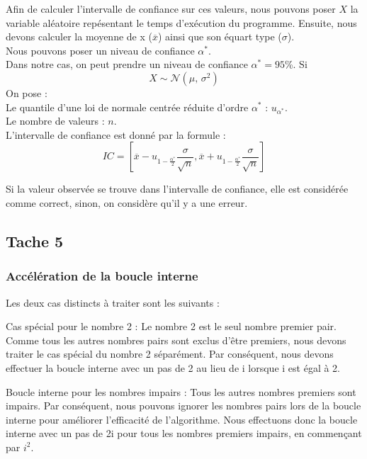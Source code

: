 \documentclass[
    ]{article}
\begin{document}
Afin de calculer l'intervalle de confiance sur ces valeurs, nous pouvons
poser \(X\) la variable aléatoire repésentant le temps d'exécution du
programme. Ensuite, nous devons calculer la moyenne de x
(\(\overline{x}\)) ainsi que son équart type (\(\sigma\)).\\
Nous pouvons poser un niveau de confiance \(\alpha^{*}\).\\
Dans notre cas, on peut prendre un niveau de confiance
\(\alpha^{*} = 95\)\%. Si \[X \sim \mathcal{N}(\mu,\,\sigma^{2})\] On
pose :\\
Le quantile d'une loi de normale centrée réduite d'ordre \(\alpha^{*}\)
: \(u_{\alpha^{*}}\).\\
Le nombre de valeurs : \(n\).\\
L'intervalle de confiance est donné par la formule :\\
\begin{equation}
IC = [\overline{x} - u_{1- \frac{\alpha^{*}}{2}} \frac{\sigma}{\sqrt{n}} , \overline{x} + u_{1- \frac{\alpha^{*}}{2}} \frac{\sigma}{\sqrt{n}} ]
\end{equation}

Si la valeur observée se trouve dans l'intervalle de confiance, elle est
considérée comme correct, sinon, on considère qu'il y a une erreur.

\pagebreak

\hypertarget{tache-5}{%
\subsection{Tache 5}\label{tache-5}}

\hypertarget{accuxe9luxe9ration-de-la-boucle-interne}{%
\subsubsection{Accélération de la boucle
interne}\label{accuxe9luxe9ration-de-la-boucle-interne}}

Les deux cas distincts à traiter sont les suivants :

Cas spécial pour le nombre 2 : Le nombre 2 est le seul nombre premier
pair. Comme tous les autres nombres pairs sont exclus d'être premiers,
nous devons traiter le cas spécial du nombre 2 séparément. Par
conséquent, nous devons effectuer la boucle interne avec un pas de 2 au
lieu de i lorsque i est égal à 2.

Boucle interne pour les nombres impairs : Tous les autres nombres
premiers sont impairs. Par conséquent, nous pouvons ignorer les nombres
pairs lors de la boucle interne pour améliorer l'efficacité de
l'algorithme. Nous effectuons donc la boucle interne avec un pas de 2i
pour tous les nombres premiers impairs, en commençant par \(i^2\).
\end{document}
